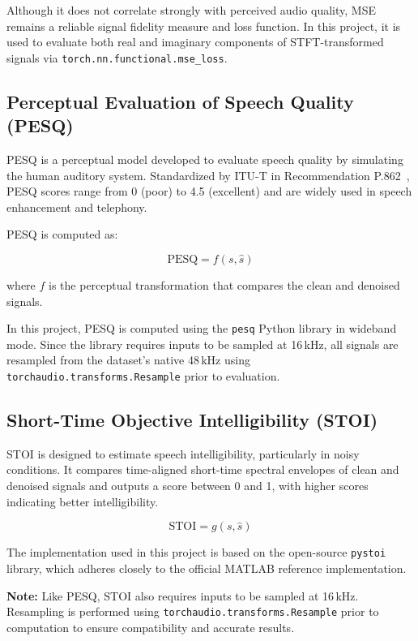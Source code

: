 Although it does not correlate strongly with perceived audio quality, MSE remains a reliable signal fidelity measure and loss function. In this project, it is used to evaluate both real and imaginary components of STFT-transformed signals via \texttt{torch.nn.functional.mse\_loss}.

\subsection{Perceptual Evaluation of Speech Quality (PESQ)}
\label{subsec:pesq}

PESQ is a perceptual model developed to evaluate speech quality by simulating the human auditory system. Standardized by ITU-T in Recommendation P.862~\cite{pesq_metric}, PESQ scores range from 0 (poor) to 4.5 (excellent) and are widely used in speech enhancement and telephony.

PESQ is computed as:

\begin{equation}
\text{PESQ} = f(s, \hat{s})
\end{equation}

where $f$ is the perceptual transformation that compares the clean and denoised signals.

In this project, PESQ is computed using the \texttt{pesq} Python library in wideband mode. Since the library requires inputs to be sampled at 16 kHz, all signals are resampled from the dataset's native 48 kHz using \texttt{torchaudio.transforms.Resample} prior to evaluation.

\subsection{Short-Time Objective Intelligibility (STOI)}
\label{subsec:stoi}

STOI is designed to estimate speech intelligibility, particularly in noisy conditions. It compares time-aligned short-time spectral envelopes of clean and denoised signals and outputs a score between 0 and 1, with higher scores indicating better intelligibility.

\begin{equation}
\text{STOI} = g(s, \hat{s})
\end{equation}

The implementation used in this project is based on the open-source \texttt{pystoi} library, which adheres closely to the official MATLAB reference implementation.

\textbf{Note:} Like PESQ, STOI also requires inputs to be sampled at 16 kHz. Resampling is performed using \texttt{torchaudio.transforms.Resample} prior to computation to ensure compatibility and accurate results.

